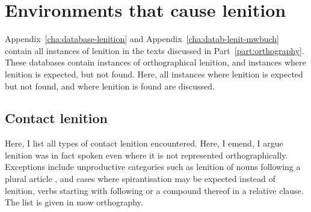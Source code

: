 \chapter{Environments that cause lenition}
\label{cha:envir-that-cause}

Appendix~\ref{cha:database-lenition} and Appendix~\ref{cha:datab-lenit-mwbuch} contain all instances of lenition in the texts discussed in Part~\ref{part:orthography}. These databases contain instances of orthographical lenition, and instances where  lenition is expected, but not found. Here, all instances where lenition is expected but not found, and where lenition is found are discussed.

\section{Contact lenition}
\label{sec:contact-lenition-1}
Here, I list all types of contact lenition encountered. Here, I emend, \ie I argue lenition was in fact spoken even where it is not represented orthographically. Exceptions include unproductive categories such as lenition of nouns following a plural article \eg {}, and cases where spirantisation may be expected instead of lenition, \eg verbs starting with  following  or a compound thereof in a relative clause. The list is given in \gls{mow} orthography. 

